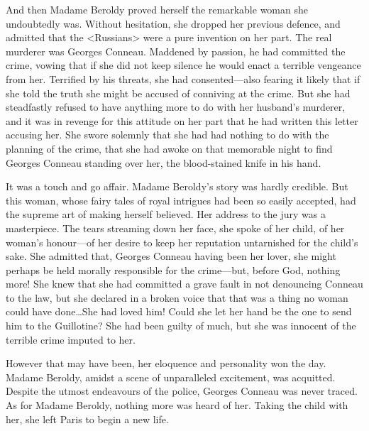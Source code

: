  And then Madame Beroldy proved herself the remarkable woman she undoubtedly was. Without hesitation, she dropped her previous defence, and admitted that the <Russians> were a pure invention on her part. The real murderer was Georges Conneau. Maddened by passion, he had committed the crime, vowing that if she did not keep silence he would enact a terrible vengeance from her. Terrified by his threats, she had consented—also fearing it likely that if she told the truth she might be accused of conniving at the crime. But she had steadfastly refused to have anything more to do with her husband's murderer, and it was in revenge for this attitude on her part that he had written this letter accusing her. She swore solemnly that she had had nothing to do with the planning of the crime, that she had awoke on that memorable night to find Georges Conneau standing over her, the blood-stained knife in his hand. 

 It was a touch and go affair. Madame Beroldy's story was hardly credible. But this woman, whose fairy tales of royal intrigues had been so easily accepted, had the supreme art of making herself believed. Her address to the jury was a masterpiece. The tears streaming down her face, she spoke of her child, of her woman's honour—of her desire to keep her reputation untarnished for the child's sake. She admitted that, Georges Conneau having been her lover, she might perhaps be held morally responsible for the crime—but, before God, nothing more! She knew that she had committed a grave fault in not denouncing Conneau to the law, but she declared in a broken voice that that was a thing no woman could have done\dots She had loved him! Could she let her hand be the one to send him to the Guillotine? She had been guilty of much, but she was innocent of the terrible crime imputed to her. 

 However that may have been, her eloquence and personality won the day. Madame Beroldy, amidst a scene of unparalleled excitement, was acquitted. Despite the utmost endeavours of the police, Georges Conneau was never traced. As for Madame Beroldy, nothing more was heard of her. Taking the child with her, she left Paris to begin a new life.